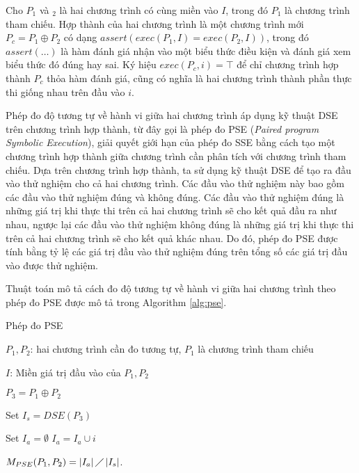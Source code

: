 \begin{definition}
  \label{def:combination}
  Cho $P_1$ và $_2$ là hai chương trình có cùng miền vào $I$, trong đó
  $P_1$ là chương trình tham chiếu. Hợp thành của hai chương trình là
  một chương trình mới $P_c = P_1 \oplus P_2$ có dạng
  $assert(exec(P_{1}, I) = exec(P_{2}, I))$, trong đó $assert(\dots)$
  là hàm đánh giá nhận vào một biểu thức điều kiện và đánh giá xem
  biểu thức đó đúng hay sai. Ký hiệu $exec(P_c,i) = \top$ để chỉ
  chương trình hợp thành $P_c$ thỏa hàm đánh giá, cũng có nghĩa là hai
  chương trình thành phần thực thi giống nhau trên đầu vào $i$.
\end{definition}

Phép đo độ tương tự về hành vi giữa hai chương trình áp dụng kỹ thuật
DSE trên chương trình hợp thành, từ đây gọi là phép đo PSE
(\emph{Paired program Symbolic Execution}), giải quyết giới hạn của
phép đo SSE bằng cách tạo một chương trình hợp thành giữa chương trình
cần phân tích với chương trình tham chiếu. Dựa trên chương trình hợp
thành, ta sử dụng kỹ thuật DSE để tạo ra đầu vào thử nghiệm cho cả hai
chương trình. Các đầu vào thử nghiệm này bao gồm các đầu vào thử
nghiệm đúng và không đúng. Các đầu vào thử nghiệm đúng là những giá
trị khi thực thi trên cả hai chương trình sẽ cho kết quả đầu ra như
nhau, ngược lại các đầu vào thử nghiệm không đúng là những giá trị khi
thực thi trên cả hai chương trình sẽ cho kết quả khác nhau. Do đó,
phép đo PSE được tính bằng tỷ lệ các giá trị đầu vào thử
nghiệm đúng trên tổng số các giá trị đầu vào được thử nghiệm.

Thuật toán mô tả cách đo độ tương tự về hành vi giữa hai chương trình theo phép đo PSE được mô tả trong Algorithm \ref{alg:pse}.

 \begin{algorithm}[h]
   \caption{Phép đo PSE}
   \label{alg:pse}
   \begin{algorithmic}
   \item $P_{1}, P_{2}$: hai chương trình cần đo tương tự, $P_1$ là
     chương trình tham chiếu
   \item $I$: Miền giá trị đầu vào của $P_{1}, P_{2}$
   \item $P_{3} = P_1 \oplus P_2$
   \item Set $I_{s} = DSE(P_{3})$ 
   \item Set $I_{a} = \emptyset$ 
     	\State $I_{a} = I_{a} \cup i$ 
     	\EndIf 
     	\EndFor
   \item
     $M_{PSE}(P_{1}, P_{2}) = \left|I_{a}\right| \diagup
     \left|I_{s}\right| $.
   \end{algorithmic}
 \end{algorithm}

